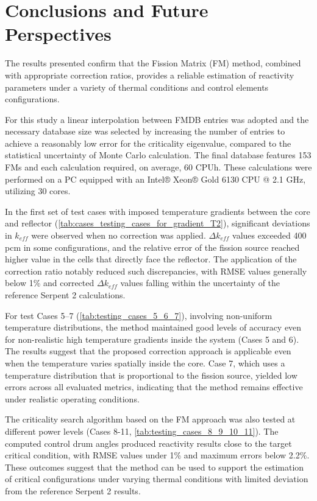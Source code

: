 \documentclass[preprint,review,12pt]{elsarticle}
\begin{document}
\section{Conclusions and Future Perspectives}

The results presented confirm that the Fission Matrix (FM) method, combined with appropriate correction ratios, provides a reliable estimation of reactivity parameters under a variety of thermal conditions and control elements configurations.

For this study a linear interpolation between FMDB entries was adopted and the necessary database size was selected by increasing the number of entries to achieve a reasonably low error for the criticality eigenvalue, compared to the statistical uncertainty of Monte Carlo calculation. The final database features 153 FMs and each calculation required, on average, 60 CPUh. These calculations were performed on a PC equipped with an Intel® Xeon® Gold 6130 CPU @ 2.1 GHz, utilizing 30 cores. 
 
In the first set of test cases with imposed temperature gradients between the core and reflector (\cref{tab:cases_testing_cases_for_gradient_T2}), significant deviations in $k_{eff}$ were observed when no correction was applied. $\Delta k_{eff}$ values exceeded 400 pcm in some configurations, and the relative error of the fission source reached higher value in the cells that directly face the reflector. The application of the correction ratio notably reduced such discrepancies, with RMSE values generally below 1\% and corrected $\Delta k_{eff}$ values falling within the uncertainty of the reference Serpent 2 calculations.

For test Cases 5--7 (\cref{tab:testing_cases_5_6_7}), involving non-uniform temperature distributions, the method maintained good levels of accuracy even for non-realistic high temperature gradients inside the system (Cases 5 and 6). The results suggest that the proposed correction approach is applicable even when the temperature varies spatially inside the core. Case 7, which uses a temperature distribution that is proportional to the fission source, yielded low errors across all evaluated metrics, indicating that the method remains effective under realistic operating conditions.

The criticality search algorithm based on the FM approach was also tested at different power levels (Cases 8-11, \cref{tab:testing_cases_8_9_10_11}). The computed control drum angles produced reactivity results close to the target critical condition, with RMSE values under 1\% and maximum errors below 2.2\%. These outcomes suggest that the method can be used to support the estimation of critical configurations under varying thermal conditions with limited deviation from the reference Serpent 2 results. 
\end{document}
